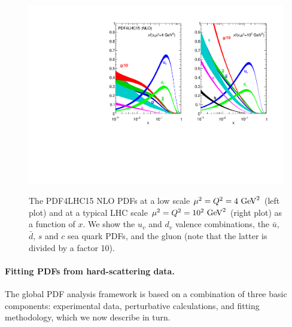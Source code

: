 \begin{figure}[t]
\begin{center}
  \includegraphics[scale=0.8]{plots/PDF4LHC15.pdf}\\
  \caption{\small The PDF4LHC15 NLO PDFs at a low scale
    $\mu^2=Q^2=4~{\rm GeV}^2$ (left plot) and at a typical LHC scale
    $\mu^2=Q^2=10^2~{\rm GeV}^2$ (right plot) as a function of $x$.
    We show the $u_v$ and $d_v$ valence combinations, the $\bar{u}$,
    $\bar{d}$, $s$ and $c$ sea quark PDFs, and the gluon (note that
    the latter is divided by a factor 10).
    \label{fig:nnlopdfs}
  }
\end{center}
\end{figure}

\paragraph*{Fitting PDFs from hard-scattering data.}
%
The global PDF analysis framework is based on a combination of three basic components: experimental
data, perturbative calculations, and fitting methodology, which we now describe
in turn.

